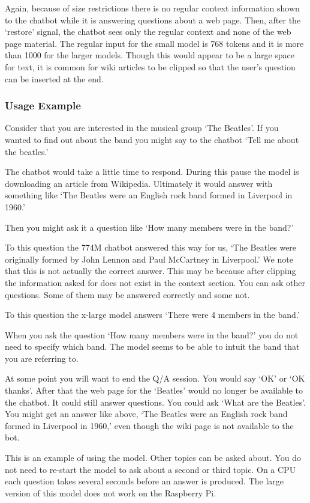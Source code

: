 Again, because of size restrictions there is no regular context information shown to the chatbot while it is answering questions about a web page. Then, after the `restore' signal, the chatbot sees only the regular context and none of the web page material. The regular input for the small model is 768 tokens and it is more than 1000 for the larger models. Though this would appear to be a large space for text, it is common for wiki articles to be clipped so that the user's question can be inserted at the end.

\subsubsection{Usage Example}

Consider that you are interested in the musical group `The Beatles'. If you wanted to find out about the band you might say to the chatbot `Tell me about the beatles.'

The chatbot would take a little time to respond. During this pause the model is downloading an article from Wikipedia. Ultimately it would answer with something like `The Beatles were an English rock band formed in Liverpool in 1960.'

Then you might ask it a question like `How many members were in the band?'

To this question the 774M chatbot answered this way for us, `The Beatles were originally formed by John Lennon and Paul McCartney in Liverpool.' We note that this is not actually the correct answer. This may be because after clipping the information asked for does not exist in the context section. You can ask other questions. Some of them may be answered correctly and some not. 

To this question the x-large model answers `There were 4 members in the band.'

When you ask the question `How many members were in the band?' you do not need to specify which band. The model seems to be able to intuit the band that you are referring to.

At some point you will want to end the Q/A session. You would say `OK' or `OK thanks'. After that the web page for the `Beatles' would no longer be available to the chatbot. It could still answer questions. You could ask `What are the Beatles'. You might get an answer like above, `The Beatles were an English rock band formed in Liverpool in 1960,' even though the wiki page is not available to the bot.

This is an example of using the model. Other topics can be asked about. You do not need to re-start the model to ask about a second or third topic. On a CPU each question takes several seconds before an answer is produced. The large version of this model does not work on the Raspberry Pi.

